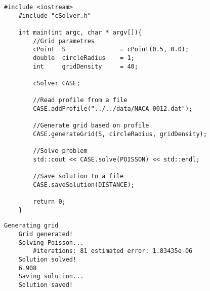 \begin{lstlisting}[label=list:program,caption=Przykładowy program rozwiązujący zagadnienie]
	#include <iostream>
	#include "cSolver.h"

	int main(int argc, char * argv[]){
		//Grid parametres
		cPoint	S				= cPoint(0.5, 0.0);	
		double	circleRadius	= 1;
		int		gridDensity		= 40;

		cSolver CASE;

		//Read profile from a file
		CASE.addProfile("../../data/NACA_0012.dat");

		//Generate grid based on profile
		CASE.generateGrid(S, circleRadius, gridDensity);

		//Solve problem
		std::cout << CASE.solve(POISSON) << std::endl;
	
		//Save solution to a file
		CASE.saveSolution(DISTANCE);	
	
		return 0;
	}
\end{lstlisting}


\begin{lstlisting}[label=list:konsola,caption=Widok konsoli programu]
	Generating grid
	Grid generated!
	Solving Poisson...
		#iterations: 81	estimated error: 1.83435e-06
	Solution solved!
	6.908
	Saving solution...
	Solution saved!
\end{lstlisting}
